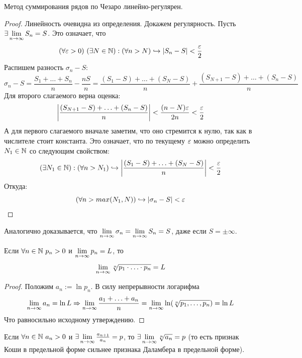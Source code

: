 \begin{theorem}
	Метод суммирования рядов по Чезаро линейно-регулярен.
\end{theorem}

\begin{proof}
	Линейность очевидна из определения. Докажем регулярность.
	Пусть $\exists \lim\limits_{n \to \infty} S_n = S$. Это означает, что
	\[
		(\forall \varepsilon > 0)\ (\exists N \in \mathbb{N}) : (\forall n > N)\hookrightarrow |S_n - S| < \frac{\varepsilon}{2}
	\]
	Распишем разность $\sigma_n - S$:
	\[
		\sigma_n - S = \frac{S_1 + \ldots + S_n}{n} - \frac{nS}{n} = \frac{(S_1 - S) + \ldots + (S_N - S)}{n} + \frac{(S_{N + 1} - S) + \ldots + (S_n - S)}{n}
	\]
	Для второго слагаемого верна оценка:
	\[
		\left|\frac{(S_{N + 1} - S) + \ldots + (S_n - S)}{n}\right| < \frac{(n - N)\varepsilon}{2n} < \frac{\varepsilon}{2}
	\]
	А для первого слагаемого вначале заметим, что оно стремится к нулю, так как в числителе стоит константа. Это означает, что по текущему $\varepsilon$ можно определить $N_1 \in \mathbb{N}$ со следующим свойством:
	\[
		(\exists N_1 \in \mathbb{N}) : (\forall n > N_1)\hookrightarrow \left|\frac{(S_1 - S) + \ldots + (S_N - S)}{n}\right| < \frac{\varepsilon}{2}
	\]
	Откуда:
	\[
		(\forall n > max(N_1, N))\hookrightarrow |\sigma_n - S| < \varepsilon
	\]
\end{proof}

\begin{note}
	Аналогично доказывается, что $\lim\limits_{n \to \infty} \sigma_n = \lim\limits_{n \to \infty} S_n = S$, даже если $S = \pm \infty$.
\end{note}

\begin{corollary}
	Если $\forall n \in \mathbb{N}\ p_n > 0$ и $\lim\limits_{n \to \infty} p_n = L$, то
	\[
		\lim\limits_{n \to \infty} \sqrt[n]{p_1 \cdot \ldots \cdot p_n} = L
	\]
\end{corollary}

\begin{proof}
	Положим $a_n := \ln p_n$. В силу непрерывности логарифма
	\[
		\lim\limits_{n \to \infty} a_n = \ln L \Rightarrow \lim\limits_{n \to \infty} \frac{a_1 + \ldots + a_n}{n} = \lim\limits_{n \to \infty} \ln (\sqrt[n]{p_1, \ldots, p_n}) = \ln L
	\]
	Что равносильно исходному утверждению.
\end{proof}

\begin{corollary}
	Если $\forall n \in \mathbb{N}\ a_n > 0$ и $\exists \lim\limits_{n \to \infty} \frac{a_{n + 1}}{a_n} = p$, то $\exists \lim\limits_{n \to \infty} \sqrt[n]{a_n} = p$ (то есть признак Коши в предельной форме сильнее признака Даламбера в предельной форме).
\end{corollary}

